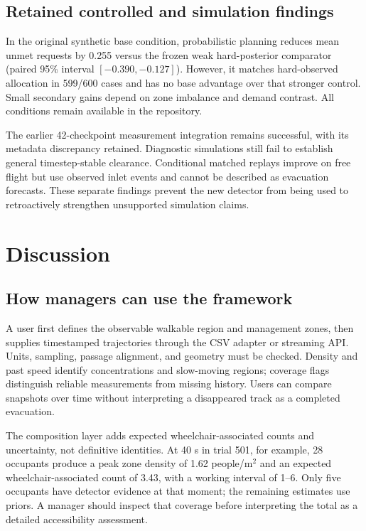 \documentclass[conference]{IEEEtran}
\begin{document}
\subsection{Retained controlled and simulation findings}
In the original synthetic base condition, probabilistic planning reduces mean unmet requests by 0.255 versus the frozen weak hard-posterior comparator (paired 95\% interval $[-0.390,-0.127]$). However, it matches hard-observed allocation in 599/600 cases and has no base advantage over that stronger control. Small secondary gains depend on zone imbalance and demand contrast. All conditions remain available in the repository.

The earlier 42-checkpoint measurement integration remains successful, with its metadata discrepancy retained. Diagnostic simulations still fail to establish general timestep-stable clearance. Conditional matched replays improve on free flight but use observed inlet events and cannot be described as evacuation forecasts. These separate findings prevent the new detector from being used to retroactively strengthen unsupported simulation claims.

\section{Discussion}
\subsection{How managers can use the framework}
A user first defines the observable walkable region and management zones, then supplies timestamped trajectories through the CSV adapter or streaming API. Units, sampling, passage alignment, and geometry must be checked. Density and past speed identify concentrations and slow-moving regions; coverage flags distinguish reliable measurements from missing history. Users can compare snapshots over time without interpreting a disappeared track as a completed evacuation.

The composition layer adds expected wheelchair-associated counts and uncertainty, not definitive identities. At 40 s in trial 501, for example, 28 occupants produce a peak zone density of 1.62 people/m$^2$ and an expected wheelchair-associated count of 3.43, with a working interval of 1--6. Only five occupants have detector evidence at that moment; the remaining estimates use priors. A manager should inspect that coverage before interpreting the total as a detailed accessibility assessment.
\end{document}
